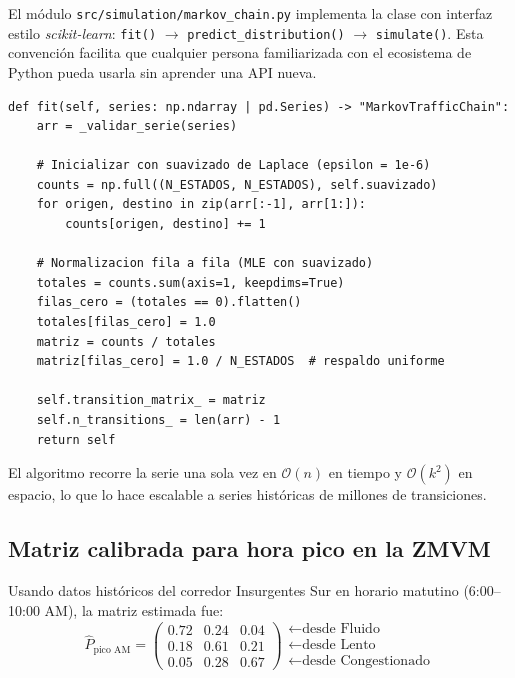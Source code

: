 \documentclass[11pt,a4paper]{article}
\begin{document}
El módulo \texttt{src/simulation/markov\_chain.py} implementa la clase con interfaz estilo \textit{scikit-learn}: \texttt{fit()} $\to$ \texttt{predict\_distribution()} $\to$ \texttt{simulate()}. Esta convención facilita que cualquier persona familiarizada con el ecosistema de Python pueda usarla sin aprender una API nueva.

\begin{lstlisting}[caption={Estimación de la matriz de transición por conteo, ecuación~\eqref{eq:laplace}.},label={lst:fit}]
def fit(self, series: np.ndarray | pd.Series) -> "MarkovTrafficChain":
    arr = _validar_serie(series)

    # Inicializar con suavizado de Laplace (epsilon = 1e-6)
    counts = np.full((N_ESTADOS, N_ESTADOS), self.suavizado)
    for origen, destino in zip(arr[:-1], arr[1:]):
        counts[origen, destino] += 1

    # Normalizacion fila a fila (MLE con suavizado)
    totales = counts.sum(axis=1, keepdims=True)
    filas_cero = (totales == 0).flatten()
    totales[filas_cero] = 1.0
    matriz = counts / totales
    matriz[filas_cero] = 1.0 / N_ESTADOS  # respaldo uniforme

    self.transition_matrix_ = matriz
    self.n_transitions_ = len(arr) - 1
    return self
\end{lstlisting}

El algoritmo recorre la serie una sola vez en $\mathcal{O}(n)$ en tiempo y $\mathcal{O}(k^2)$ en espacio, lo que lo hace escalable a series históricas de millones de transiciones.

\subsection{Matriz calibrada para hora pico en la ZMVM}

Usando datos históricos del corredor Insurgentes Sur en horario matutino (6:00--10:00 AM), la matriz estimada fue:
\begin{equation}
\hat{P}_\text{pico AM} = \begin{pmatrix}
0.72 & 0.24 & 0.04 \\
0.18 & 0.61 & 0.21 \\
0.05 & 0.28 & 0.67
\end{pmatrix}
\begin{array}{l}
\leftarrow \text{desde Fluido} \\
\leftarrow \text{desde Lento} \\
\leftarrow \text{desde Congestionado}
\end{array}
\label{eq:matrizpico}
\end{equation}
\end{document}
